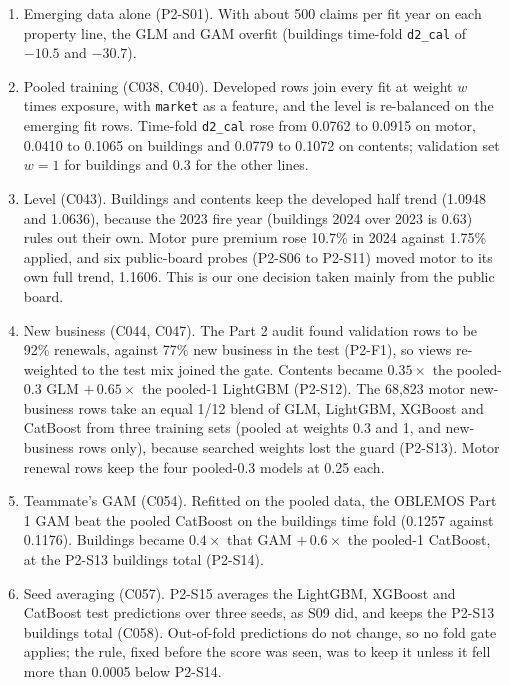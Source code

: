 \documentclass[11pt,a4paper]{article}
\newcommand{\code}[1]{\texttt{#1}}
\begin{document}
\begin{enumerate}\setlength{\itemsep}{1pt}\setlength{\parskip}{0pt}\setlength{\topsep}{2pt}
\item Emerging data alone (P2-S01). With about 500 claims per fit year on each property line, the GLM and GAM overfit
(buildings time-fold \code{d2\_cal} of $-10.5$ and $-30.7$).
\item Pooled training (C038, C040). Developed rows join every fit at weight $w$ times exposure, with \code{market} as a
feature, and the level is re-balanced on the emerging fit rows. Time-fold \code{d2\_cal} rose from 0.0762 to 0.0915 on
motor, 0.0410 to 0.1065 on buildings and 0.0779 to 0.1072 on contents; validation set $w = 1$ for buildings and $0.3$
for the other lines.
\item Level (C043). Buildings and contents keep the developed half trend (1.0948 and 1.0636), because the 2023 fire
year (buildings 2024 over 2023 is 0.63) rules out their own. Motor pure premium rose 10.7\% in 2024 against 1.75\%
applied, and six public-board probes (P2-S06 to P2-S11) moved motor to its own full trend, 1.1606. This is our one
decision taken mainly from the public board.
\item New business (C044, C047). The Part 2 audit found validation rows to be 92\% renewals, against 77\% new business
in the test (P2-F1), so views re-weighted to the test mix joined the gate. Contents became $0.35\times$ the pooled-0.3
GLM $+\,0.65\times$ the pooled-1 LightGBM (P2-S12). The 68,823 motor new-business rows take an equal 1/12 blend of GLM,
LightGBM, XGBoost and CatBoost from three training sets (pooled at weights 0.3 and 1, and new-business rows only),
because searched weights lost the guard (P2-S13). Motor renewal rows keep the four pooled-0.3 models at 0.25 each.
\item Teammate's GAM (C054). Refitted on the pooled data, the OBLEMOS Part 1 GAM beat the pooled CatBoost on the
buildings time fold (0.1257 against 0.1176). Buildings became $0.4\times$ that GAM $+\,0.6\times$ the pooled-1
CatBoost, at the P2-S13 buildings total (P2-S14).
\item Seed averaging (C057). P2-S15 averages the LightGBM, XGBoost and CatBoost test predictions over three seeds, as
S09 did, and keeps the P2-S13 buildings total (C058). Out-of-fold predictions do not change, so no fold gate applies;
the rule, fixed before the score was seen, was to keep it unless it fell more than 0.0005 below P2-S14.
\end{enumerate}
\end{document}
